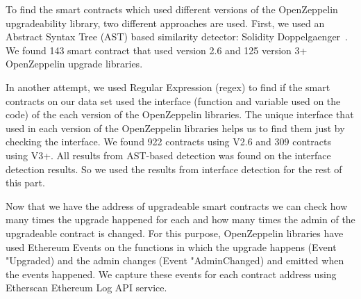 To find the smart contracts which used different versions of the OpenZeppelin upgradeability library, two different approaches are used. First, we used an Abstract Syntax Tree (AST) based similarity detector: Solidity Doppelgaenger~\cite{solidity-doppelganger}. We found 143 smart contract that used version 2.6 and 125 version 3+ OpenZeppelin upgrade libraries. 

In another attempt, we used Regular Expression (regex) to find if the smart contracts on our data set used the interface (function and variable used on the code) of the each version of the OpenZeppelin libraries. The unique interface that used in each version of the OpenZeppelin libraries helps us to find them just by checking the interface. We found 922 contracts using V2.6 and 309 contracts using V3+. All results from AST-based detection was found on the interface detection results. So we used the results from interface detection for the rest of this part.

Now that we have the address of upgradeable smart contracts we can check how many times the upgrade happened for each and how many times the admin of the upgradeable contract is changed. For this purpose, OpenZeppelin libraries have used Ethereum Events on the functions in which the upgrade happens (Event "Upgraded) and the admin changes (Event "AdminChanged) and emitted when the events happened. We capture these events for each contract address using Etherscan Ethereum Log API service.

